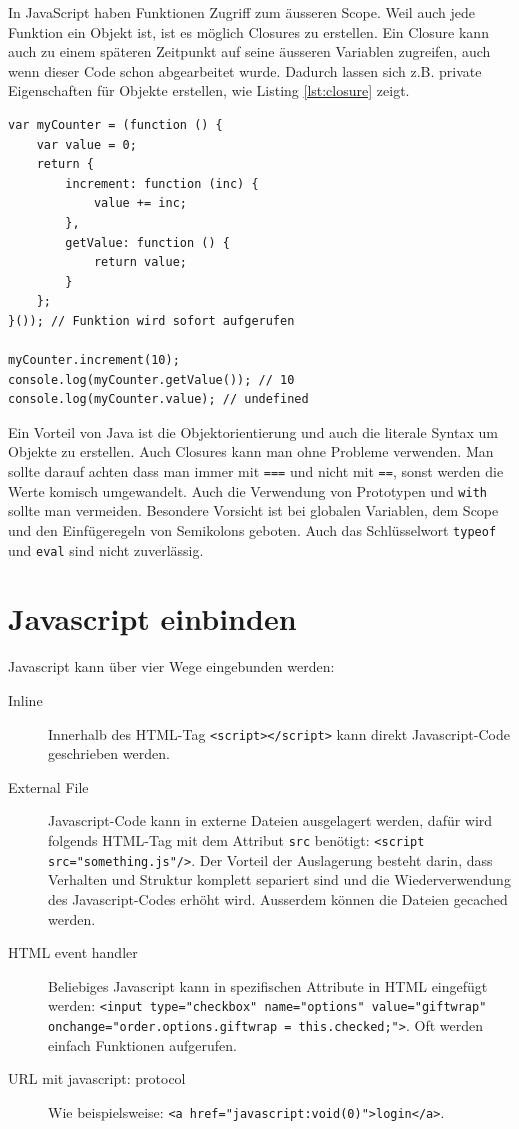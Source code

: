 In JavaScript haben Funktionen Zugriff zum äusseren Scope. Weil auch jede Funktion ein Objekt ist, ist es möglich Closures zu erstellen. Ein Closure kann auch zu einem späteren Zeitpunkt auf seine äusseren Variablen zugreifen, auch wenn dieser Code schon abgearbeitet wurde. Dadurch lassen sich z.B. private Eigenschaften für Objekte erstellen, wie Listing \ref{lst:closure} zeigt.

\begin{lstlisting}[label=lst:closure,caption=Closure]
var myCounter = (function () {
	var value = 0;
	return {
		increment: function (inc) {
			value += inc;
		},
		getValue: function () {
			return value;
		}
	};
}()); // Funktion wird sofort aufgerufen

myCounter.increment(10);
console.log(myCounter.getValue()); // 10
console.log(myCounter.value); // undefined
\end{lstlisting}

Ein Vorteil von Java ist die Objektorientierung und auch die literale Syntax um Objekte zu erstellen. Auch Closures kann man ohne Probleme verwenden. Man sollte darauf achten dass man immer mit \lstinline|===| und nicht mit \lstinline|==|, sonst werden die Werte komisch umgewandelt. Auch die Verwendung von Prototypen und \lstinline|with| sollte man vermeiden. Besondere Vorsicht ist bei globalen Variablen, dem Scope und den Einfügeregeln von Semikolons geboten. Auch das Schlüsselwort \lstinline|typeof| und \lstinline|eval| sind nicht zuverlässig.

\section{Javascript einbinden}
Javascript kann über vier Wege eingebunden werden:
\begin{description}
	\item[Inline] Innerhalb des HTML-Tag \lstinline|<script></script>| kann direkt Javascript-Code geschrieben werden.
	\item[External File] Javascript-Code kann in externe Dateien ausgelagert werden, dafür wird folgends HTML-Tag mit dem Attribut \lstinline|src| benötigt: \lstinline|<script src="something.js"/>|. Der Vorteil der Auslagerung besteht darin, dass Verhalten und Struktur komplett separiert sind und die Wiederverwendung des Javascript-Codes erhöht wird. Ausserdem können die Dateien gecached werden.
	\item[HTML event handler] Beliebiges Javascript kann in spezifischen Attribute in HTML eingefügt werden: \lstinline|<input type="checkbox" name="options" value="giftwrap" onchange="order.options.giftwrap = this.checked;">|. Oft werden einfach Funktionen aufgerufen.
	\item[URL mit javascript: protocol] Wie beispielsweise: \lstinline|<a href="javascript:void(0)">login</a>|.
\end{description}

